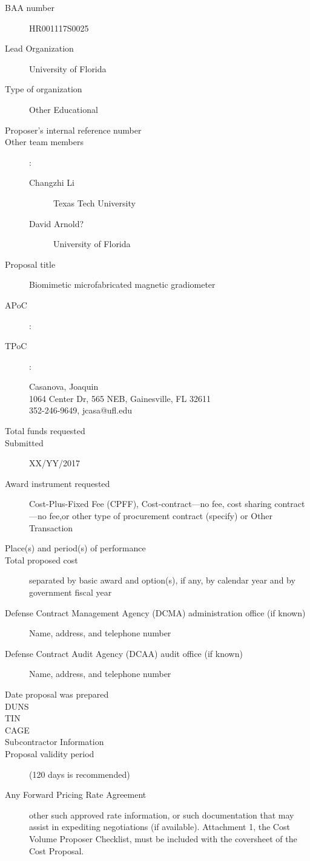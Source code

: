 
\begin{description}
\item [BAA number] HR001117S0025
\item [Lead Organization] University of Florida
\item [Type of organization] Other Educational
\item [Proposer’s internal reference number]
\item [Other team members]:
\begin{description}
\item [Changzhi Li] Texas Tech University
\item [David Arnold?] University of Florida 
\end{description}
\item [Proposal title] Biomimetic microfabricated magnetic gradiometer
\item [APoC]:
\begin{description}
\item []
\item []
\item []
\end{description}
\item [TPoC]:
\begin{description}
\item [Casanova, Joaquin]
\item [1064 Center Dr, 565 NEB, Gainesville, FL 32611]
\item [352-246-9649, jcasa@ufl.edu]
\end{description}
\item [Total funds requested]
\item [Submitted] XX/YY/2017

\item [Award instrument requested] Cost-Plus-Fixed Fee (CPFF), Cost-contract—no fee, cost sharing contract—no fee,or other type of procurement contract (specify) or Other Transaction
\item [Place(s) and period(s) of performance]
\item [Total proposed cost] separated by basic award and option(s), if any, by calendar year
and by government fiscal year
\item [Defense Contract Management Agency (DCMA) administration office (if known)] Name, address, and telephone number
\item [Defense Contract Audit Agency (DCAA) audit office (if known)] Name, address, and telephone number
\item [Date proposal was prepared]
\item [DUNS]
\item [TIN]
\item [CAGE]
\item [Subcontractor Information]
\item [Proposal validity period] (120 days is recommended)
\item [Any Forward Pricing Rate Agreement] other such approved rate information, or such documentation that may assist in expediting negotiations (if available).
Attachment 1, the Cost Volume Proposer Checklist, must be included with the coversheet
of the Cost Proposal.
\end{description}
\newpage

